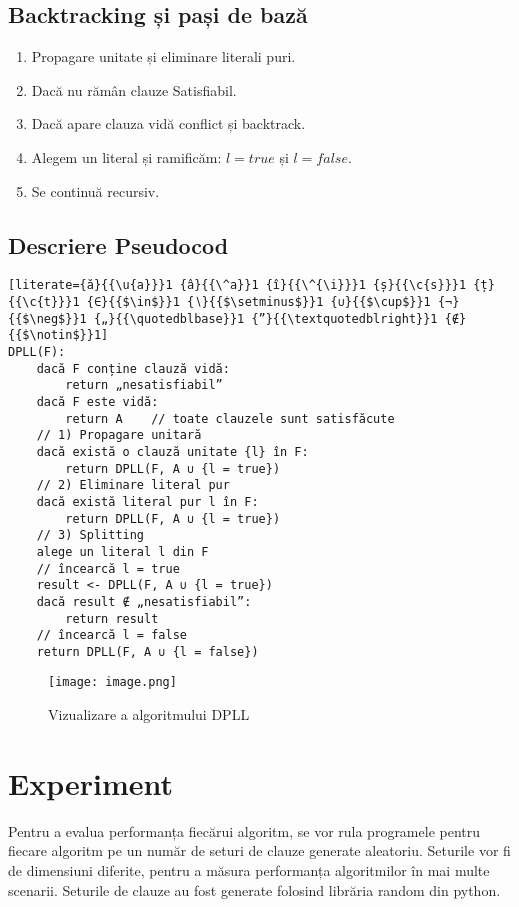 \documentclass[12pt]{article}
\begin{document}
\subsection{Backtracking și pași de bază}
\begin{enumerate}
  \item Propagare unitate și eliminare literali puri.
  \item Dacă nu rămân clauze \textemdash{} Satisfiabil.
  \item Dacă apare clauza vidă \textemdash{} conflict și backtrack.
  \item Alegem un literal și ramificăm: $l=true$ și $l=false$.
  \item Se continuă recursiv.
\end{enumerate}
\subsection{Descriere Pseudocod}
\begin{lstlisting}[literate={ă}{{\u{a}}}1 {â}{{\^a}}1 {î}{{\^{\i}}}1 {ș}{{\c{s}}}1 {ț}{{\c{t}}}1 {∈}{{$\in$}}1 {∖}{{$\setminus$}}1 {∪}{{$\cup$}}1 {¬}{{$\neg$}}1 {„}{{\quotedblbase}}1 {”}{{\textquotedblright}}1 {∉}{{$\notin$}}1]
DPLL(F):
    dacă F conține clauză vidă:
        return „nesatisfiabil”
    dacă F este vidă:
        return A    // toate clauzele sunt satisfăcute
    // 1) Propagare unitară
    dacă există o clauză unitate {l} în F:
        return DPLL(F, A ∪ {l = true})
    // 2) Eliminare literal pur
    dacă există literal pur l în F:
        return DPLL(F, A ∪ {l = true})
    // 3) Splitting
    alege un literal l din F
    // încearcă l = true
    result <- DPLL(F, A ∪ {l = true})
    dacă result ∉ „nesatisfiabil”:
        return result
    // încearcă l = false
    return DPLL(F, A ∪ {l = false})
\end{lstlisting}
\begin{figure}
    \centering
    \texttt{[image: image.png]}
    \caption{Vizualizare a algoritmului DPLL}
    \label{sigma}
\end{figure}
\section{Experiment}
Pentru a evalua performanța fiecărui algoritm, se vor rula programele pentru fiecare algoritm pe un număr de seturi de clauze generate aleatoriu. Seturile vor fi de dimensiuni diferite, pentru a măsura performanța algoritmilor în mai multe scenarii. Seturile de clauze au fost generate folosind librăria random din python.
\end{document}
